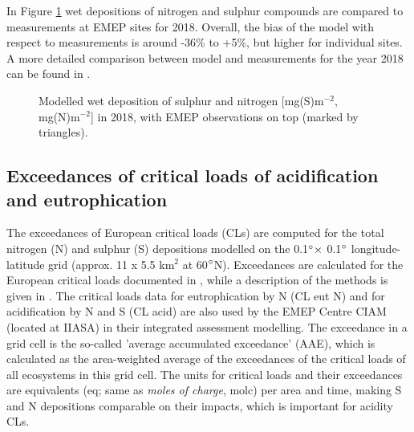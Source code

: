 In Figure \ref{wdeps} wet depositions of nitrogen and sulphur compounds are compared to measurements at EMEP sites for 2018. Overall, the bias of the model with respect to measurements is around 
-36\% to +5\%, but higher for individual sites. A more detailed comparison between model and measurements for the year 2018 can be found in \cite{WEB2020:SN}.

\begin{figure}[H]
  \centering
 \caption{Modelled wet deposition of sulphur and nitrogen [mg(S)m$^{-2}$, mg(N)m$^{-2}$] in 2018, with EMEP observations on top (marked by triangles).}
\label{wdeps}
\end{figure}

\subsection{Exceedances of critical loads of acidification and eutrophication}\label{subs:exceedSnN}

The exceedances of European critical loads (CLs) are computed for the total nitrogen
(N) and sulphur (S) depositions modelled on the 0.1$^\circ \times$ 0.1$^\circ$
longitude-latitude grid (approx. 11 x 5.5 km$^{2}$ at 60$^\circ$N).
Exceedances are calculated for the European critical loads documented in \cite{Hettelingh:2017}, while
a description of the methods is given in \cite{DeVries:2015}. The
critical loads data for eutrophication by N (CL eut N) and for acidification by N and S
(CL acid) are also used by the EMEP Centre CIAM (located at IIASA) in their integrated assessment
modelling. The exceedance in a grid cell is the so-called ’average accumulated
exceedance’ (AAE), which is calculated as the area-weighted average of the
exceedances of the critical loads of all ecosystems in this grid cell. The units for
critical loads and their exceedances are equivalents (eq; same as \textit{moles of charge},
molc) per area and time, making S and N depositions comparable on their impacts, which is important for
acidity CLs.

